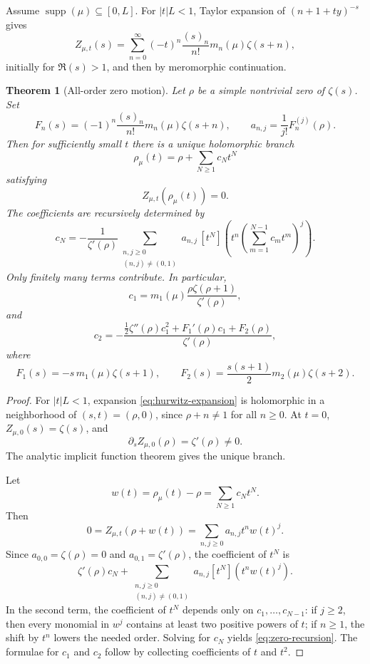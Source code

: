 \documentclass[11pt]{article}
\newcommand{\supp}{\operatorname{supp}}
\theoremstyle{plain}
\newtheorem{theorem}{Theorem}[section]
\theoremstyle{definition}
\numberwithin{equation}{section}
\begin{document}
Assume \(\supp(\mu)\subseteq[0,L]\).  For \(|t|L<1\), Taylor expansion of \((n+1+ty)^{-s}\) gives
\begin{equation}\label{eq:hurwitz-expansion}
 Z_{\mu,t}(s)=\sum_{n=0}^{\infty}(-t)^n\frac{(s)_n}{n!}m_n(\mu)\zeta(s+n),
\end{equation}
initially for \(\Re(s)>1\), and then by meromorphic continuation.

\begin{theorem}[All-order zero motion]\label{thm:zero-motion}
Let \(\rho\) be a simple nontrivial zero of \(\zeta(s)\).  Set
\[
 F_n(s)=(-1)^n\frac{(s)_n}{n!}m_n(\mu)\zeta(s+n),
 \qquad
 a_{n,j}=\frac1{j!}F_n^{(j)}(\rho).
\]
Then for sufficiently small \(t\) there is a unique holomorphic branch
\[
 \rho_\mu(t)=\rho+\sum_{N\ge1}c_Nt^N
\]
satisfying
\[
 Z_{\mu,t}(\rho_\mu(t))=0.
\]
The coefficients are recursively determined by
\begin{equation}\label{eq:zero-recursion}
 c_N=-\frac1{\zeta'(\rho)}
 \sum_{\substack{n,j\ge0\\(n,j)\ne(0,1)}}
 a_{n,j}\,[t^N]\left(t^n\left(\sum_{m=1}^{N-1}c_mt^m\right)^j\right).
\end{equation}
Only finitely many terms contribute.  In particular,
\[
 c_1=m_1(\mu)\frac{\rho\zeta(\rho+1)}{\zeta'(\rho)},
\]
and
\[
 c_2=-\frac{\frac12\zeta''(\rho)c_1^2+F_1'(\rho)c_1+F_2(\rho)}{\zeta'(\rho)},
\]
where
\[
 F_1(s)=-s\,m_1(\mu)\zeta(s+1),
 \qquad
 F_2(s)=\frac{s(s+1)}2m_2(\mu)\zeta(s+2).
\]
\end{theorem}

\begin{proof}
For \(|t|L<1\), expansion \eqref{eq:hurwitz-expansion} is holomorphic in a neighborhood of \((s,t)=(\rho,0)\), since \(\rho+n\ne1\) for all \(n\ge0\).  At \(t=0\), \(Z_{\mu,0}(s)=\zeta(s)\), and
\[
 \partial_s Z_{\mu,0}(\rho)=\zeta'(\rho)\ne0.
\]
The analytic implicit function theorem gives the unique branch.

Let
\[
 w(t)=\rho_\mu(t)-\rho=\sum_{N\ge1}c_Nt^N.
\]
Then
\[
 0=Z_{\mu,t}(\rho+w(t))=
 \sum_{n,j\ge0}a_{n,j}t^nw(t)^j.
\]
Since \(a_{0,0}=\zeta(\rho)=0\) and \(a_{0,1}=\zeta'(\rho)\), the coefficient of \(t^N\) is
\[
 \zeta'(\rho)c_N+
 \sum_{\substack{n,j\ge0\\(n,j)\ne(0,1)}}
 a_{n,j}[t^N](t^nw(t)^j).
\]
In the second term, the coefficient of \(t^N\) depends only on \(c_1,\ldots,c_{N-1}\): if \(j\ge2\), then every monomial in \(w^j\) contains at least two positive powers of \(t\); if \(n\ge1\), the shift by \(t^n\) lowers the needed order.  Solving for \(c_N\) yields \eqref{eq:zero-recursion}.  The formulae for \(c_1\) and \(c_2\) follow by collecting coefficients of \(t\) and \(t^2\).
\end{proof}
\end{document}
